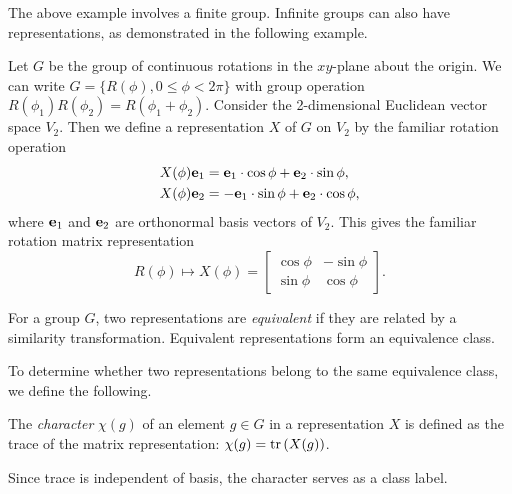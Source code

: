 The above example involves a finite group. Infinite groups can also have representations, as demonstrated in the following example.
\begin{example}
    Let $G$ be the group of continuous rotations in the $xy$-plane about the origin. We can write $G = \{R(\phi),0\leq\phi<2\pi\}$ with group operation $R(\phi_1)R(\phi_2) = R(\phi_1+\phi_2)$. Consider the 2-dimensional Euclidean vector space $V_2$. Then we define a representation $X$ of $G$ on $V_2$ by the familiar rotation operation
    \begin{align}
        X(\phi)\mathbf{e}_1 &= \mathbf{e}_1\cdot\cos\phi + \mathbf{e}_2\cdot\sin\phi, \\
        X(\phi)\mathbf{e}_2 &= -\mathbf{e}_1\cdot\sin\phi + \mathbf{e}_2\cdot\cos\phi,
    \end{align}
    where $\mathbf{e}_1$ and $\mathbf{e}_2$ are orthonormal basis vectors of $V_2$. This gives the familiar rotation matrix representation
    \begin{equation}
        R(\phi) \mapsto X(\phi) = \begin{bmatrix}
            \cos\phi & -\sin\phi\\
            \sin\phi & \cos\phi
        \end{bmatrix}.
    \end{equation}
\end{example}

\begin{definition}
    For a group $G$, two representations are \textit{equivalent} if they are related by a similarity transformation. Equivalent representations form an equivalence class.
\end{definition}

To determine whether two representations belong to the same equivalence class, we define the following.
\begin{definition}
    The \textit{character} $\chi(g)$ of an element $g\in G$ in a representation $X$ is defined as the trace of the matrix representation: $\chi(g) = \textrm{tr}\left(X(g)\right)$.
\end{definition}
Since trace is independent of basis, the character serves as a class label.


